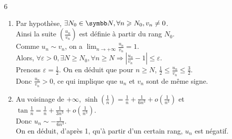 \begin{correction}{6}
\begin{enumerate}
    \item 
    Par hypothèse, $\exists N_{0}\in\N, \forall n\geqslant N_{0}, v_{n}\ne0$. \\
    Ainsi la suite $\left(\frac{u_{n}}{v_{n}}\right)$ est définie à partir du rang $N_{0}$. \\
    Comme $u_{n}\sim v_{n}$, on a $\lim_{n\rightarrow+\infty}\frac{u_{n}}{v_{n}}=1$. \\
    Alors, $\forall\varepsilon>0, \exists N\geqslant N_{0}, \forall n\geqslant N \Rightarrow |\frac{u_{n}}{v_{n}}-1|\leqslant\varepsilon$. \\
    Prenons $\varepsilon=\frac{1}{2}$. On en déduit que pour $n \geqslant N$, $\frac{1}{2} \leqslant \frac{u_n}{v_n} \leqslant \frac{3}{2}$. \\
    Donc $\frac{u_{n}}{v_{n}}>0$, ce qui implique que $u_{n}$ et $v_{n}$ sont de même signe.

    \item
    Au voisinage de $+\infty$, $\sinh\left(\frac{1}{n}\right)=\frac{1}{n}+\frac{1}{6n^{3}}+o\left(\frac{1}{n^{3}}\right)$
    et $\tan\frac{1}{n}=\frac{1}{n}+\frac{1}{3n^{3}}+o(\frac{1}{n^{3}})$. \\
    Donc $u_{n}\sim -\frac{1}{6n^{3}}$. \\
    On en déduit, d'après 1, qu'à partir d'un certain rang, $u_{n}$ est négatif.
\end{enumerate}
\end{correction}

